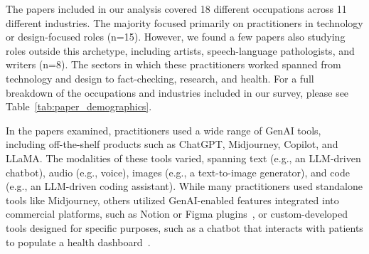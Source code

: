 The papers included in our analysis covered 18 different occupations across 11 different industries. The majority focused primarily on practitioners in technology or design-focused roles (n=15). However, we found a few papers also studying roles outside this archetype, including artists, speech-language pathologists, and writers (n=8). The sectors in which these practitioners worked spanned from technology and design to fact-checking, research, and health. For a full breakdown of the occupations and industries included in our survey, please see Table~\ref{tab:paper_demographics}.

In the papers examined, practitioners used a wide range of GenAI tools, including off-the-shelf products such as ChatGPT, Midjourney, Copilot, and LLaMA. The modalities of these tools varied, spanning text (e.g., an LLM-driven chatbot), audio (e.g., voice), images (e.g., a text-to-image generator), and code (e.g., an LLM-driven coding assistant). While many practitioners used standalone tools like Midjourney, others utilized GenAI-enabled features integrated into commercial platforms, such as Notion or Figma plugins~\cite{6}, or custom-developed tools designed for specific purposes, such as a chatbot that interacts with patients to populate a health dashboard~\cite{5}.


